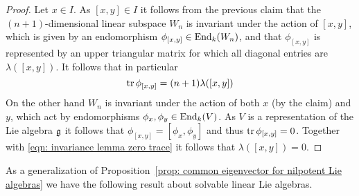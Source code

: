 \begin{proof}
 Let $x \in I$. As $[x,y] \in I$ it follows from the previous claim that the $(n+1)$-dimensional linear subspace $W_n$ is invariant under the action of $[x,y]$, which is given by an endomorphism $\phi_{[x,y]} \in \operatorname{End}_k(W_n)$, and that $\phi_{[x,y]}$ is represented by an upper triangular matrix for which all diagonal entries are $\lambda([x,y])$. It follows that in particular
 \begin{equation}\label{eqn: invariance lemma zero trace}
  \operatorname{tr} \phi_{[x,y]} = (n+1) \lambda([x,y])
 \end{equation}
 On the other hand $W_n$ is invariant under the action of both $x$ (by the claim) and $y$, which act by endomorphisms $\phi_x, \phi_y \in \operatorname{End}_k(V)$. As $V$ is a representation of the Lie algebra $\mathfrak{g}$ it follows that $\phi_{[x,y]} = [\phi_x, \phi_y]$ and thus $\operatorname{tr} \phi_{[x,y]} = 0$. Together with \eqref{eqn: invariance lemma zero trace} it follows that $\lambda([x,y]) = 0$.
\end{proof}


As a generalization of Proposition~\ref{prop: common eigenvector for nilpotent Lie algebras} we have the following result about solvable linear Lie algebras.


